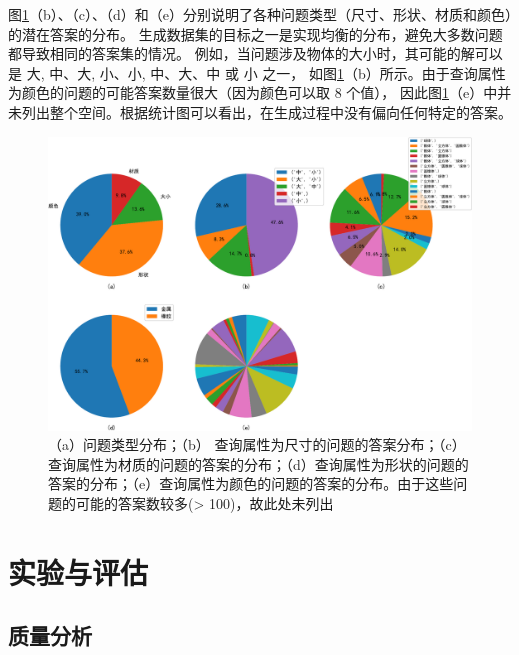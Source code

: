 图\ref{fig:question_statistics}（b）、（c）、（d）和（e）分别说明了各种问题类型（尺寸、形状、材质和颜色）的潜在答案的分布。
生成数据集的目标之一是实现均衡的分布，避免大多数问题都导致相同的答案集的情况。
例如，当问题涉及物体的大小时，其可能的解可以是
 {大, 中}、{大, 小}、{小, 中}、{大}、{中} 或 {小} 之一，
 如图\ref{fig:question_statistics}（b）所示。由于查询属性为颜色的问题的可能答案数量很大（因为颜色可以取 8 个值），
 因此图\ref{fig:question_statistics}（e）中并未列出整个空间。根据统计图可以看出，在生成过程中没有偏向任何特定的答案。
\begin{figure}[h]
    \centering
    \includegraphics[width=\textwidth]{figures/question_distribution-crop.pdf}
    \caption{（a）问题类型分布；（b） 查询属性为尺寸的问题的答案分布；（c）查询属性为材质的问题的答案的分布；（d）查询属性为形状的问题的答案的分布；（e）查询属性为颜色的问题的答案的分布。由于这些问题的可能的答案数较多(> 100)，故此处未列出}
    \label{fig:question_statistics}
\end{figure}
\section{实验与评估}
\subsection{质量分析}
